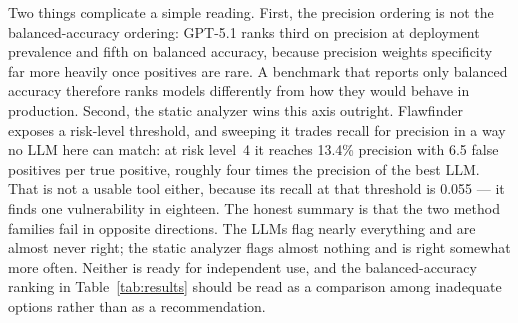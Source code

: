 \documentclass[computers,article,submit,moreauthors]{Definitions/mdpi}
\begin{document}
Two things complicate a simple reading. First, the precision ordering is not the balanced-accuracy ordering: GPT-5.1 ranks third on precision at deployment prevalence and fifth on balanced accuracy, because precision weights specificity far more heavily once positives are rare. A benchmark that reports only balanced accuracy therefore ranks models differently from how they would behave in production. Second, the static analyzer wins this axis outright. Flawfinder exposes a risk-level threshold, and sweeping it trades recall for precision in a way no LLM here can match: at risk level~4 it reaches 13.4\% precision with 6.5 false positives per true positive, roughly four times the precision of the best LLM. That is not a usable tool either, because its recall at that threshold is 0.055 --- it finds one vulnerability in eighteen. The honest summary is that the two method families fail in opposite directions. The LLMs flag nearly everything and are almost never right; the static analyzer flags almost nothing and is right somewhat more often. Neither is ready for independent use, and the balanced-accuracy ranking in Table~\ref{tab:results} should be read as a comparison among inadequate options rather than as a recommendation.
\end{document}

